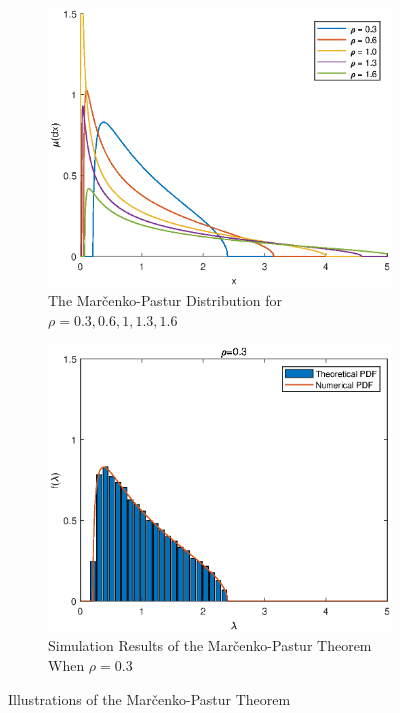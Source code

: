 \begin{figure}[htbp]
	\centering
	\begin{subfigure}{.45\linewidth}
		\includegraphics[width=\textwidth]{random-matrix-theory/figures/marchenko-pastur-distribution.eps}
		\caption{The Mar\v{c}enko-Pastur Distribution for \(\rho=0.3,0.6,1,1.3,1.6\)}
	\end{subfigure}
	\begin{subfigure}{.45\linewidth}
		\includegraphics[width=\textwidth]{random-matrix-theory/figures/marchenko-pastur-theorem-simulation.eps}
		\caption{Simulation Results of the Mar\v{c}enko-Pastur Theorem When \(\rho=0.3\)}
	\end{subfigure}
	\caption{Illustrations of the Mar\v{c}enko-Pastur Theorem}
\end{figure}

